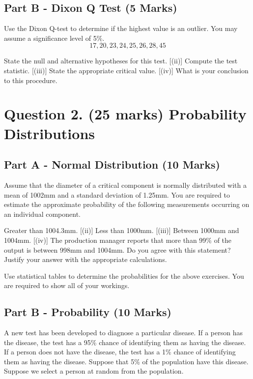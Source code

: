 \subsection*{Part B - Dixon Q Test (5 Marks)}

	
	Use the Dixon Q-test to determine if the highest value is an outlier. You may assume a significance level of 5\%.
		\[ 17,20,23,24,25,26,28,45\]
	\begin{itemize}
	[(i)] State the null and alternative hypotheses for this test.
	[(ii)] Compute the test statistic.
	[(iii)] State the appropriate critical value.
	[(iv)] What is your conclusion to this procedure.
	\end{itemize}



\section*{Question 2. (25 marks) Probability Distributions }




\subsection*{Part A - Normal Distribution (10 Marks)}

\smallskip	
\noindent Assume that the diameter of a critical component is normally distributed with a mean of 1002mm and a standard deviation of 1.25mm. You are required  to estimate the approximate probability of the following measurements occurring on an individual component.
\begin{itemize}
[(i)] Greater than 1004.3mm.
[(ii)] Less than 1000mm.
 [(iii)] Between 1000mm and 1004mm.
[(iv)]  The production manager reports that more than 99\% of the output is between 998mm and 1004mm. Do you agree with this statement? Justify your answer with the appropriate calculations.
\end{itemize}
\medskip
\noindent Use statistical tables to determine the probabilities for the above exercises. You are required to show all of your workings.

\bigskip
\subsection*{Part B - Probability (10 Marks)} %
A new test has been developed to diagnose a particular disease. If a person has the disease, the test has a 95\% chance of identifying them as having the disease.
If a person does not have the disease, the test has a 1\% chance of identifying them as having the disease.  Suppose that 5\% of the population have this disease. Suppose we select a person at random from the population.


